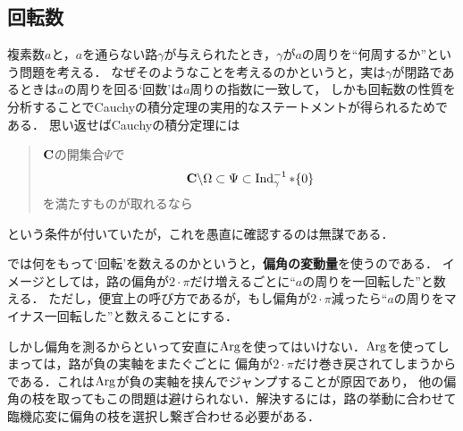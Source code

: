 \subsection{回転数}
	
	複素数$a$と，$a$を通らない路$\gamma$が与えられたとき，$\gamma$が$a$の周りを``何周するか''という問題を考える．
	なぜそのようなことを考えるのかというと，実は$\gamma$が閉路であるときは$a$の周りを回る`回数'は$a$周りの指数に一致して，
	しかも回転数の性質を分析することでCauchyの積分定理の実用的なステートメントが得られるためである．
	思い返せばCauchyの積分定理には
	\begin{quote}
		$\mathbf{C}$の開集合$\Psi$で
		\begin{align}
			\mathbf{C} \backslash \Omega \subset \Psi \subset \operatorname{Ind}_{\gamma}^{-1} \ast \{0\}
		\end{align}
		を満たすものが取れるなら
	\end{quote}
	という条件が付いていたが，これを愚直に確認するのは無謀である．
	
	では何をもって`回転'を数えるのかというと，{\bf 偏角の変動量}を使うのである．
	イメージとしては，路の偏角が$2 \cdot \pi$だけ増えるごとに``$a$の周りを一回転した''と数える．
	ただし，便宜上の呼び方であるが，もし偏角が$2\cdot\pi$減ったら``$a$の周りをマイナス一回転した''と数えることにする．
	
	\begin{center}
	\end{center}
	
	しかし偏角を測るからといって安直に$\operatorname{Arg}$を使ってはいけない．$\operatorname{Arg}$を使ってしまっては，路が負の実軸をまたぐごとに
	偏角が$2 \cdot \pi$だけ巻き戻されてしまうからである．これは$\operatorname{Arg}$が負の実軸を挟んでジャンプすることが原因であり，
	他の偏角の枝を取ってもこの問題は避けられない．解決するには，路の挙動に合わせて臨機応変に偏角の枝を選択し繋ぎ合わせる必要がある．
	
